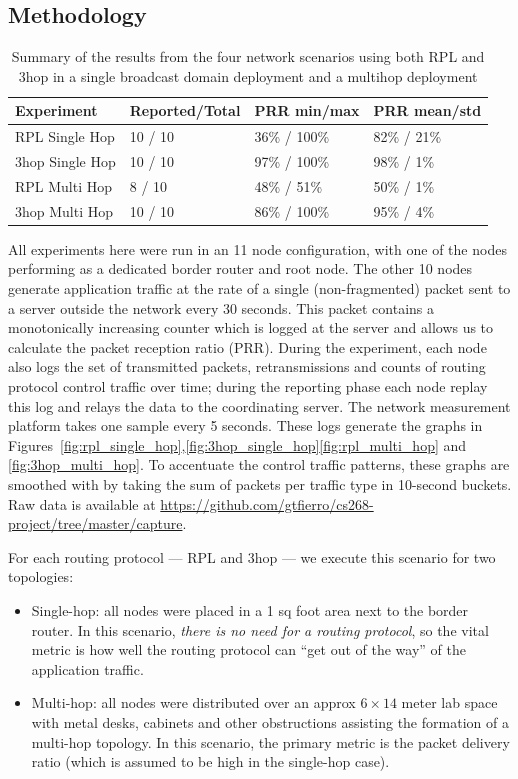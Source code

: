 \subsection{Methodology}

\begin{table}[t]
\centering
\caption{Summary of the results from the four network scenarios using both RPL and 3hop in a single broadcast domain deployment and a multihop deployment}
\label{table:results}
\begin{tabular}{|l|l|l|l|}
\hline
\textbf{Experiment} & \textbf{Reported/Total} & \textbf{PRR min/max} & \textbf{PRR mean/std} \\
\hline
\hline
RPL Single Hop & 10 / 10 & 36\% / 100\% & 82\% / 21\% \\
3hop Single Hop & 10 / 10 & 97\% / 100\% & 98\% / 1\% \\
RPL Multi Hop & 8 / 10 & 48\% / 51\% & 50\% / 1\% \\
3hop Multi Hop & 10 / 10 & 86\% / 100\% & 95\% / 4\% \\
\hline
\end{tabular}
\end{table}


All experiments here were run in an 11 node configuration, with one of the nodes performing as a dedicated border router and root node.
The other 10 nodes generate application traffic at the rate of a single (non-fragmented) packet sent to a server outside the network every 30 seconds.
This packet contains a monotonically increasing counter which is logged at the server and allows us to calculate the packet reception ratio (PRR).
During the experiment, each node also logs the set of transmitted packets, retransmissions and counts of routing protocol control traffic over time; during the reporting phase each node replay this log and relays the data to the coordinating server.
The network measurement platform takes one sample every 5 seconds.
These logs generate the graphs in Figures~\ref{fig:rpl_single_hop},\ref{fig:3hop_single_hop}\ref{fig:rpl_multi_hop} and \ref{fig:3hop_multi_hop}.
To accentuate the control traffic patterns, these graphs are smoothed with by taking the sum of packets per traffic type in 10-second buckets. Raw data is available at \url{https://github.com/gtfierro/cs268-project/tree/master/capture}.

For each routing protocol --- RPL and 3hop --- we execute this scenario for two topologies:
\begin{itemize}
\item Single-hop: all nodes were placed in a 1 sq foot area next to the border router.
In this scenario, \emph{there is no need for a routing protocol}, so the vital metric is how well the routing protocol can ``get out of the way'' of the application traffic.
\item Multi-hop: all nodes were distributed over an approx $6\times 14$ meter lab space with metal desks, cabinets and other obstructions assisting the formation of a multi-hop topology.
In this scenario, the primary metric is the packet delivery ratio (which is assumed to be high in the single-hop case).
\end{itemize}


